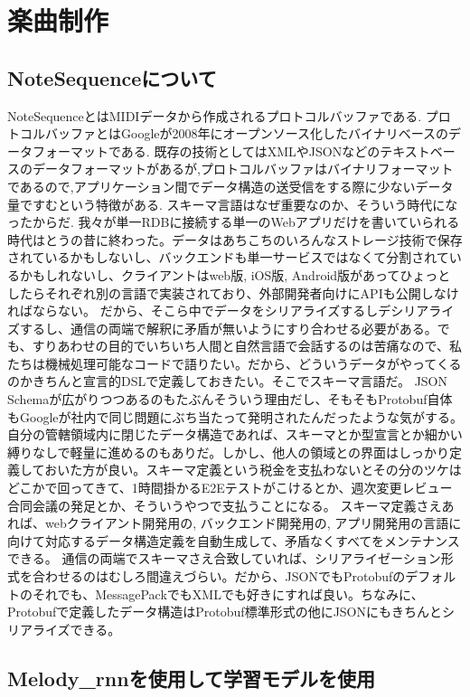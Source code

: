 \chapter{楽曲制作}
\section{NoteSequenceについて}
NoteSequenceとはMIDIデータから作成されるプロトコルバッファである.
プロトコルバッファとはGoogleが2008年にオープンソース化したバイナリベースのデータフォーマットである.
既存の技術としてはXMLやJSONなどのテキストベースのデータフォーマットがあるが,プロトコルバッファはバイナリフォーマットであるので,アプリケーション間でデータ構造の送受信をする際に少ないデータ量ですむという特徴がある.
スキーマ言語はなぜ重要なのか、そういう時代になったからだ.
我々が単一RDBに接続する単一のWebアプリだけを書いていられる時代はとうの昔に終わった。データはあちこちのいろんなストレージ技術で保存されているかもしないし、バックエンドも単一サービスではなくて分割されているかもしれないし、クライアントはweb版, iOS版, Android版があってひょっとしたらそれぞれ別の言語で実装されており、外部開発者向けにAPIも公開しなければならない。
だから、そこら中でデータをシリアライズするしデシリアライズするし、通信の両端で解釈に矛盾が無いようにすり合わせる必要がある。でも、すりあわせの目的でいちいち人間と自然言語で会話するのは苦痛なので、私たちは機械処理可能なコードで語りたい。だから、どういうデータがやってくるのかきちんと宣言的DSLで定義しておきたい。そこでスキーマ言語だ。
JSON Schemaが広がりつつあるのもたぶんそういう理由だし、そもそもProtobuf自体もGoogleが社内で同じ問題にぶち当たって発明されたんだったような気がする。
自分の管轄領域内に閉じたデータ構造であれば、スキーマとか型宣言とか細かい縛りなしで軽量に進めるのもありだ。しかし、他人の領域との界面はしっかり定義しておいた方が良い。スキーマ定義という税金を支払わないとその分のツケはどこかで回ってきて、1時間掛かるE2Eテストがこけるとか、週次変更レビュー合同会議の発足とか、そういうやつで支払うことになる。
スキーマ定義さえあれば、webクライアント開発用の, バックエンド開発用の, アプリ開発用の言語に向けて対応するデータ構造定義を自動生成して、矛盾なくすべてをメンテナンスできる。
通信の両端でスキーマさえ合致していれば、シリアライゼーション形式を合わせるのはむしろ間違えづらい。だから、JSONでもProtobufのデフォルトのそれでも、MessagePackでもXMLでも好きにすれば良い。ちなみに、Protobufで定義したデータ構造はProtobuf標準形式の他にJSONにもきちんとシリアライズできる。
\section{Melody\_rnnを使用して学習モデルを使用}
